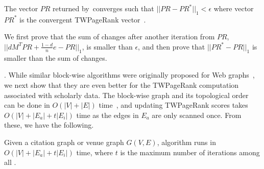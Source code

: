 \begin{cor} \label{prop-prscc}
The vector $PR$ returned by~\twprscc converges such that $||PR-PR^*||_1 < \epsilon$ where vector $PR^*$ is the convergent TWPageRank vector~\cite{Berkhin05}.
\end{cor}

\begin{proofSketch}
We first prove that the sum of changes after another iteration from $PR$, \ie $||d M^T PR + \frac{1-d}{n} e-PR||_1$, is smaller than $\epsilon$, and then prove that $||PR^*-PR||_1$ is smaller than the sum of changes. %
\end{proofSketch}





. While similar block-wise algorithms were originally proposed for Web graphs~\cite{Berkhin05}, we next show that they are even better for the TWPageRank computation associated with scholarly data.
%
The block-wise graph and its topological order can be done in $O(|V|+|E|)$ time~\cite{CormenLRS01}, and updating TWPageRank scores takes $O(|V|+|E_a|+t|E_i|)$ time as the edges in $E_a$ are only scanned once. From these, we have the following.



\begin{lemma}
\label{prop-venue-time-complexity}
Given a citation graph or venue graph $G(V, E)$, algorithm \twprscc runs in  $O(|V|+|E_a|+t|E_i|)$ time, where $t$ is  the maximum number of iterations among all \sccs.
\end{lemma}



